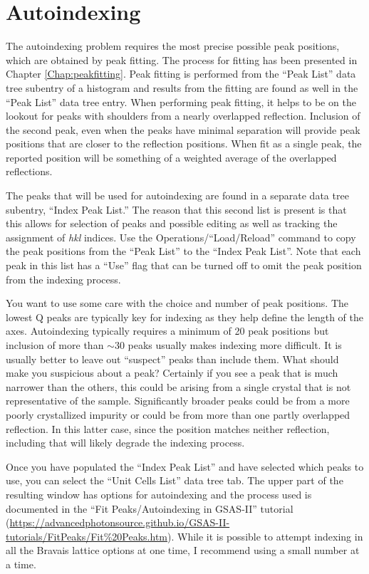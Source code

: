 \section{Autoindexing}
The autoindexing problem requires the most precise possible peak positions, which are obtained by peak fitting. The process for fitting has been presented in Chapter \ref{Chap:peakfitting}. Peak fitting is performed from the ``Peak List'' data tree subentry of a histogram and results from the fitting are found as well in the ``Peak List'' data tree entry. When performing peak fitting, it helps to be on the lookout for peaks with shoulders from a nearly overlapped reflection. Inclusion of the second peak, even when the peaks have minimal separation will provide peak positions that are closer to the reflection positions. When fit as a single peak, the reported position will be something of a weighted average of the overlapped reflections. 

The peaks that will be used for autoindexing are found in a separate data tree subentry, ``Index Peak List.'' The reason that this second list is present is that this allows for selection of peaks and possible editing as well as tracking the assignment of \textit{hkl} indices. Use the Operations/``Load/Reload'' command to copy the peak positions from the  ``Peak List'' to the ``Index Peak List''. Note that each peak in this list has a ``Use'' flag that can be turned off to omit the peak position from the indexing process. 

You want to use some care with the choice and number of peak positions. The lowest Q peaks are typically key for indexing as they help define the length of the axes. Autoindexing typically requires a minimum of 20 peak positions but inclusion of more than $\sim 30$ peaks usually makes indexing more difficult. It is usually better to leave out ``suspect'' peaks than include them. What should make you suspicious about a peak? Certainly if you see a peak that is much narrower than the others, this could be arising from a single crystal that is not representative of the sample. Significantly broader peaks could be from a more poorly crystallized impurity or could be from more than one partly overlapped reflection. In this latter case, since the position matches neither reflection, including that will likely degrade the indexing process. 

Once you have populated the ``Index Peak List'' and have selected which peaks to use, you can select the ``Unit Cells List'' data tree tab. The upper part of the resulting window has options for autoindexing and the process used is documented in the ``Fit Peaks/Autoindexing in GSAS-II'' tutorial (\url{https://advancedphotonsource.github.io/GSAS-II-tutorials/FitPeaks/Fit\%20Peaks.htm}). While it is possible to attempt indexing in all the Bravais lattice options at one time, I recommend using a small number at a time. 

